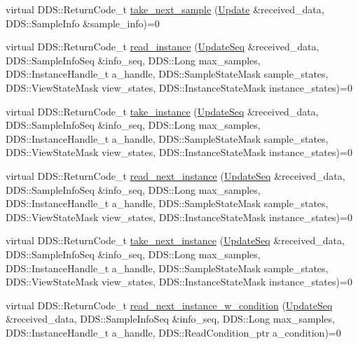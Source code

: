 \begin{DoxyCompactItemize}
\item 
virtual DDS::ReturnCode\_\-t \hyperlink{classKnowledge_1_1UpdateDataReaderView_a7554fcf0ff6e115ad9c9a6fa614cd47c}{take\_\-next\_\-sample} (\hyperlink{structKnowledge_1_1Update}{Update} \&received\_\-data, DDS::SampleInfo \&sample\_\-info)=0
\item 
virtual DDS::ReturnCode\_\-t \hyperlink{classKnowledge_1_1UpdateDataReaderView_ad1ba6eff879b04ddf4b80342b7278bfb}{read\_\-instance} (\hyperlink{namespaceKnowledge_ab62e46316b954f0d249e0e45de7059dc}{UpdateSeq} \&received\_\-data, DDS::SampleInfoSeq \&info\_\-seq, DDS::Long max\_\-samples, DDS::InstanceHandle\_\-t a\_\-handle, DDS::SampleStateMask sample\_\-states, DDS::ViewStateMask view\_\-states, DDS::InstanceStateMask instance\_\-states)=0
\item 
virtual DDS::ReturnCode\_\-t \hyperlink{classKnowledge_1_1UpdateDataReaderView_a595e41d355590e3a3ad248c32da9fdcf}{take\_\-instance} (\hyperlink{namespaceKnowledge_ab62e46316b954f0d249e0e45de7059dc}{UpdateSeq} \&received\_\-data, DDS::SampleInfoSeq \&info\_\-seq, DDS::Long max\_\-samples, DDS::InstanceHandle\_\-t a\_\-handle, DDS::SampleStateMask sample\_\-states, DDS::ViewStateMask view\_\-states, DDS::InstanceStateMask instance\_\-states)=0
\item 
virtual DDS::ReturnCode\_\-t \hyperlink{classKnowledge_1_1UpdateDataReaderView_a892f7a9a097ea0e20b83a9644e43b088}{read\_\-next\_\-instance} (\hyperlink{namespaceKnowledge_ab62e46316b954f0d249e0e45de7059dc}{UpdateSeq} \&received\_\-data, DDS::SampleInfoSeq \&info\_\-seq, DDS::Long max\_\-samples, DDS::InstanceHandle\_\-t a\_\-handle, DDS::SampleStateMask sample\_\-states, DDS::ViewStateMask view\_\-states, DDS::InstanceStateMask instance\_\-states)=0
\item 
virtual DDS::ReturnCode\_\-t \hyperlink{classKnowledge_1_1UpdateDataReaderView_af1c67955ccdcd77b3ae33b6f353a5c95}{take\_\-next\_\-instance} (\hyperlink{namespaceKnowledge_ab62e46316b954f0d249e0e45de7059dc}{UpdateSeq} \&received\_\-data, DDS::SampleInfoSeq \&info\_\-seq, DDS::Long max\_\-samples, DDS::InstanceHandle\_\-t a\_\-handle, DDS::SampleStateMask sample\_\-states, DDS::ViewStateMask view\_\-states, DDS::InstanceStateMask instance\_\-states)=0
\item 
virtual DDS::ReturnCode\_\-t \hyperlink{classKnowledge_1_1UpdateDataReaderView_a5d83f32fa162f638c17854fe3bf63f33}{read\_\-next\_\-instance\_\-w\_\-condition} (\hyperlink{namespaceKnowledge_ab62e46316b954f0d249e0e45de7059dc}{UpdateSeq} \&received\_\-data, DDS::SampleInfoSeq \&info\_\-seq, DDS::Long max\_\-samples, DDS::InstanceHandle\_\-t a\_\-handle, DDS::ReadCondition\_\-ptr a\_\-condition)=0

\end{DoxyCompactItemize}
